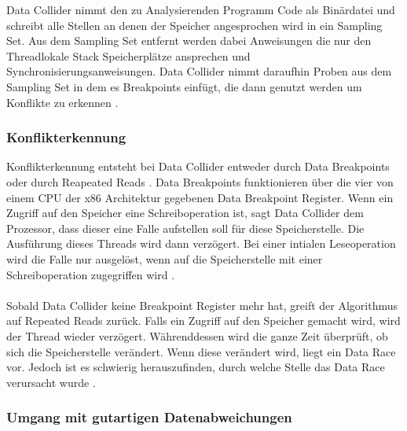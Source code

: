 Data Collider nimmt den zu Analysierenden Programm Code als Binärdatei und schreibt alle Stellen an denen der Speicher angesprochen wird in ein Sampling Set. Aus dem Sampling Set entfernt werden dabei Anweisungen die nur den Threadlokale Stack Speicherplätze ansprechen und Synchronisierungsanweisungen. Data Collider nimmt daraufhin Proben aus dem Sampling Set in dem es Breakpoints einfügt, die dann genutzt werden um Konflikte zu erkennen \cite[vgl.][6]{erickson_effective_nodate}. 

\subsubsection*{Konflikterkennung}

Konflikterkennung entsteht bei Data Collider entweder durch Data Breakpoints oder durch Reapeated Reads \cite[vgl.][7]{erickson_effective_nodate}. Data Breakpoints funktionieren über die vier von einem CPU der x86 Architektur gegebenen Data Breakpoint Register. Wenn ein Zugriff auf den Speicher eine Schreiboperation ist, sagt Data Collider dem Prozessor, dass dieser eine Falle aufstellen soll für diese Speicherstelle. Die Ausführung dieses Threads wird dann verzögert. Bei einer intialen Leseoperation wird die Falle nur ausgelöst, wenn auf die Speicherstelle mit einer Schreiboperation zugegriffen wird \cite[vgl.][7-8]{erickson_effective_nodate}.\\
\\
Sobald Data Collider keine Breakpoint Register mehr hat, greift der Algorithmus auf Repeated Reads zurück. Falls ein Zugriff auf den Speicher gemacht wird, wird der Thread wieder verzögert. Währenddessen wird die ganze Zeit überprüft, ob sich die Speicherstelle verändert. Wenn diese verändert wird, liegt ein Data Race vor. Jedoch ist es schwierig herauszufinden, durch welche Stelle das Data Race verursacht wurde \cite[vgl.][7-8]{erickson_effective_nodate}. 

\subsubsection*{Umgang mit gutartigen Datenabweichungen}

